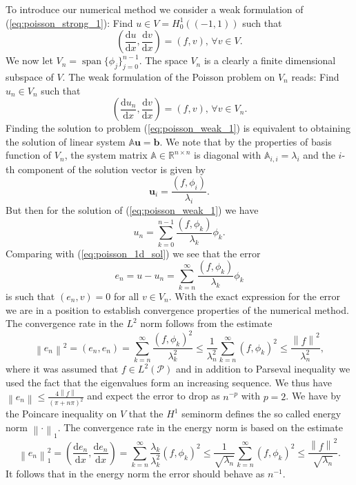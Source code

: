 \documentclass[a4paper,10pt]{article}
\newcommand{\R}{\ensuremath{\mathbb{R}}}
\newcommand{\norm}[1]{\ensuremath{\left\|#1\right\|}}
\newcommand{\inner}[2]{\ensuremath{\left(#1, #2\right)}}
\newcommand{\deriv}[2]{\ensuremath{\frac{\mathrm{d}#1}{\mathrm{d}#2}}}
\DeclareMathOperator{\spn}{span}
\begin{document}
  To introduce our numerical method we consider a weak formulation of
  (\ref{eq:poisson_strong_1}): Find $u\in V= H^1_0((-1, 1))$ such that
  \[
    \inner{\deriv{u}{x}}{\deriv{v}{x}} = \inner{f}{v},\,\forall v\in V.
  \]
  We now let $V_n=\spn\{\phi_j\}_{j=0}^{n-1}$. The space $V_n$
  is a clearly a finite dimensional subspace of $V$. The weak formulation of
  the Poisson problem on $V_n$ reads: Find $u_n\in V_n$ such that
  \begin{equation}
    \label{eq:poisson_weak_1}
    \inner{\deriv{u_n}{x}}{\deriv{v}{x}} = \inner{f}{v},\,\forall v\in V_n.
  \end{equation}
  Finding the solution to problem (\ref{eq:poisson_weak_1}) is equivalent to
  obtaining the solution of linear system $\mathbb{A}\mathbf{u}=\mathbf{b}$.
  We note that by the properties of basis function of $V_n$, the system matrix
  $\mathbb{A}\in\R^{n\times n}$ is diagonal with $\mathbb{A}_{i, i}=\lambda_i$
  and the $i$-th component of the solution vector is given by
  \[
    \mathbf{u}_i = \frac{\inner{f}{\phi_i}}{\lambda_i}.
  \]
  But then for the solution of (\ref{eq:poisson_weak_1}) we have
  \[
    u_n = \sum_{k=0}^{n-1} \frac{\inner{f}{\phi_k}}{\lambda_k} \phi_k.
  \]
  Comparing with (\ref{eq:poisson_1d_sol}) we see that the error
  \[
    e_n=u-u_n = \sum_{k=n}^{\infty} \frac{\inner{f}{\phi_k}}{\lambda_k} \phi_k
  \]
  is such that $(e_n, v)=0$ for all $v\in V_n$. With the exact expression for the
  error we are in a position to establish convergence properties of the
  numerical method. The convergence rate in the $L^2$ norm follows from the
  estimate
  \[
    \norm{e_n}^2=\inner{e_n}{e_n} = \sum_{k=n}^{\infty} \frac{\inner{f}{\phi_k}^2}{\lambda^2_k} \leq
    \frac{1}{\lambda^2_n}\sum_{k=n}^{\infty} \inner{f}{\phi_k}^2 \leq
    \frac{\norm{f}^2}{\lambda^2_n},
  \]
  where it was assumed that $f\in L^2\left(\mathcal{P}\right)$ and in addition
  to Parseval inequality we used the fact that the eigenvalues form an
  increasing sequence. We thus have $\norm{e_n}\leq\frac{4\norm{f}}{\left(\pi +
  n\pi\right)^2}$ and expect the error to drop as
  $n^{-p}$ with $p=2$. We have by the Poincare inequality on $V$ that the $H^1$ seminorm
  defines the so called energy norm $\norm{\cdot}_1$. The convergence rate in
  the energy norm is based on the estimate
  \[
    \norm{e_n}^2_1=\inner{\deriv{e_n}{x}}{\deriv{e_n}{x}} =
    \sum_{k=n}^{\infty} \frac{\lambda_k}{\lambda^2_k}(f, \phi_k)^2 \leq
    \frac{1}{\sqrt{\lambda_n}}\sum_{k=n}^{\infty} (f, \phi_k)^2 \leq
    \frac{\norm{f}^2}{\sqrt{\lambda_n}}.
  \]
  It follows that in the energy norm the error should behave as $n^{-1}$.
\end{document}
